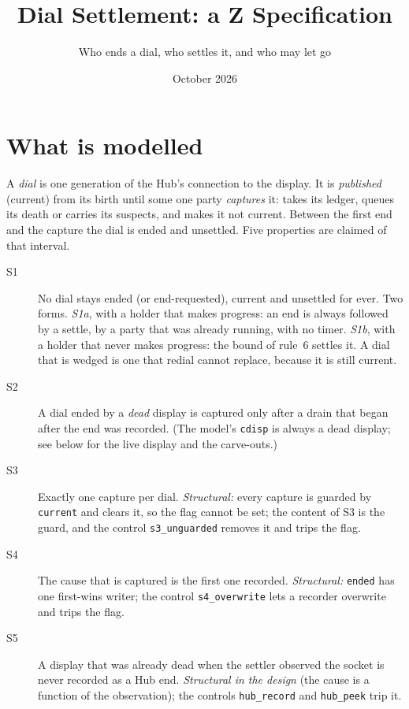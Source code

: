 \documentclass[a4paper,10pt,fleqn]{article}
\begin{document}
\title{Dial Settlement: a Z Specification}
\author{Who ends a dial, who settles it, and who may let go}
\date{October 2026}
\maketitle

\section{What is modelled}

A \emph{dial} is one generation of the Hub's connection to the display.  It is
\emph{published} (current) from its birth until some one party \emph{captures}
it: takes its ledger, queues its death or carries its suspects, and makes it
not current.  Between the first end and the capture the dial is ended and
unsettled.  Five properties are claimed of that interval.

\begin{description}
  \item[S1] No dial stays ended (or end-requested), current and unsettled for
    ever.  Two forms.  \emph{S1a}, with a holder that makes progress: an end is
    always followed by a settle, by a party that was already running, with no
    timer.  \emph{S1b}, with a holder that never makes progress: the bound of
    rule~6 settles it.  A dial that is wedged is one that redial cannot replace,
    because it is still current.
  \item[S2] A dial ended by a \emph{dead} display is captured only after a drain
    that began after the end was recorded.  (The model's \texttt{cdisp} is
    always a dead display; see below for the live display and the carve-outs.)
  \item[S3] Exactly one capture per dial.  \emph{Structural:} every capture is
    guarded by \texttt{current} and clears it, so the flag cannot be set; the
    content of S3 is the guard, and the control \texttt{s3\_unguarded} removes it
    and trips the flag.
  \item[S4] The cause that is captured is the first one recorded.
    \emph{Structural:} \texttt{ended} has one first-wins writer; the control
    \texttt{s4\_overwrite} lets a recorder overwrite and trips the flag.
  \item[S5] A display that was already dead when the settler observed the socket
    is never recorded as a Hub end.  \emph{Structural in the design} (the cause
    is a function of the observation); the controls \texttt{hub\_record} and
    \texttt{hub\_peek} trip it.
\end{description}
\end{document}
